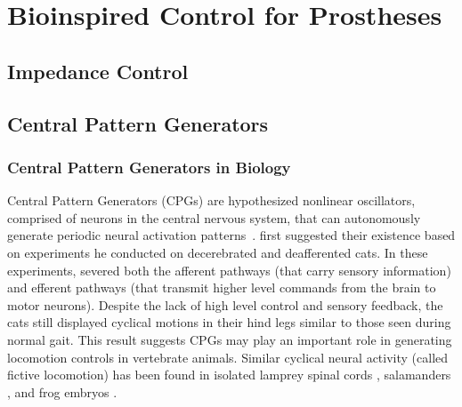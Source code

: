 \section{Bioinspired Control for
Prostheses}\label{sec:back_bioinspired_pros_control} 

\subsection{Impedance Control}

\subsection{Central Pattern Generators}
\subsubsection{Central Pattern Generators in Biology}
Central Pattern Generators (CPGs) are hypothesized nonlinear
oscillators, comprised of neurons in the central nervous system, that can
autonomously generate periodic neural activation
patterns~\citep{ijspeert2008central}.  \citet{brown1911intrinsic} first
suggested their existence based on experiments he conducted on decerebrated and
deafferented cats. In these experiments, \citeauthor{brown1911intrinsic} severed
both the afferent pathways (that carry sensory information) and efferent
pathways (that transmit higher level commands from the brain to motor neurons).
Despite the lack of high level control and sensory feedback, the cats still
displayed cyclical motions in their hind legs similar to those seen during
normal gait. This result suggests CPGs may play an important role in generating
locomotion controls in vertebrate animals. Similar cyclical neural activity
(called fictive locomotion) has been found in isolated lamprey spinal cords
\citep{cohen1980neuronal}, salamanders \citep{delvolve1999fictive}, and frog
embryos \citep{soffe1982tonic}. 

